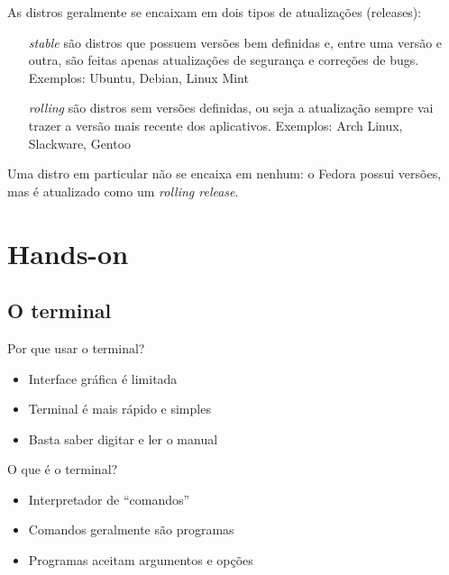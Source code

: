 \documentclass{beamer}
\begin{document}
\begin{frame}

	As distros geralmente se encaixam em dois tipos de atualizações (releases):
	\begin{itemize}
		\item[\textit{stable}] são distros que possuem versões bem definidas
			e, entre uma versão e outra, são feitas apenas atualizações de segurança
			e correções de bugs.
			\newline
			Exemplos: Ubuntu, Debian, Linux Mint
		\item[\textit{rolling}] são distros sem versões definidas, ou seja
			a atualização sempre vai trazer a versão mais recente dos aplicativos.
			\newline
			Exemplos: Arch Linux, Slackware, Gentoo
	\end{itemize}

	Uma distro em particular não se encaixa em nenhum: o Fedora possui versões,
	mas é atualizado como um \textit{rolling release}.

\end{frame}

\section{Hands-on}
\subsection{O terminal}

\begin{frame}

	Por que usar o terminal?

	\begin{itemize}
	\item Interface gráfica é limitada
	\item Terminal é mais rápido e simples
	\item Basta saber digitar e ler o manual
	\end{itemize}

\end{frame}

\begin{frame}

	O que é o terminal?

	\begin{itemize}
		\item Interpretador de ``comandos''
		\item Comandos geralmente são programas
		\item Programas aceitam argumentos e opções
	\end{itemize}

\end{frame}
\end{document}
